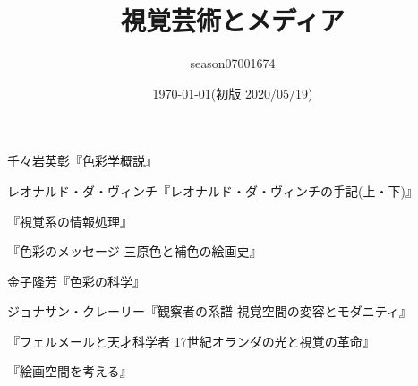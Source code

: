 \documentclass{jsarticle}
\title{視覚芸術とメディア}
\author{season07001674}
\date{\today(初版 2020/05/19)}
\begin{document}
\maketitle
\tableofcontents


\begin{thebibliography}{99}
	\item 千々岩英彰『色彩学概説』
	\item レオナルド・ダ・ヴィンチ『レオナルド・ダ・ヴィンチの手記(上・下)』
	\item 『視覚系の情報処理』
	\item 『色彩のメッセージ 三原色と補色の絵画史』
	\item 金子隆芳『色彩の科学』
	\item ジョナサン・クレーリー『観察者の系譜 視覚空間の変容とモダニティ』
	\item 『フェルメールと天才科学者 17世紀オランダの光と視覚の革命』
	\item 『絵画空間を考える』
	\item 
\end{thebibliography}
\end{document}
